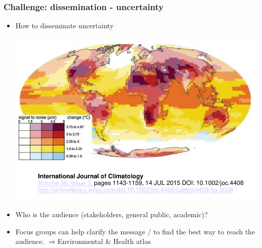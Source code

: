 \documentclass[slidestop,compress,serif,10pt]{beamer}
\begin{document}
\begin{frame}\frametitle{Challenge: dissemination - uncertainty}
\begin{itemize}
\item How to disseminate uncertainty\\
\begin{center}\includegraphics[scale=0.5]{Uncertainty}\end{center}

\item Who is the audience (stakeholders, general public, academic)?
\item Focus groups can help clarify the message / to find the best way to reach the audience.
$\Rightarrow$\alert{Environmental \& Health atlas} \href{http://www.envhealthatlas.co.uk/homepage/gotoatlas.html}{}
\end{itemize} 
\end{frame}
\end{document}
